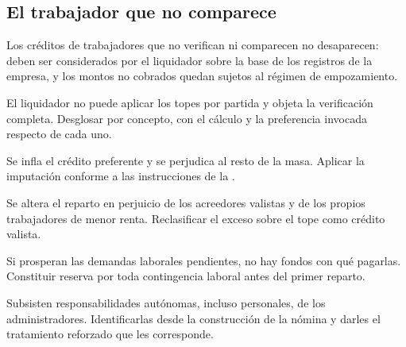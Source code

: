 \subsection{El trabajador que no comparece}

Los créditos de trabajadores que no verifican ni comparecen no desaparecen: deben ser
considerados por el liquidador sobre la base de los registros de la empresa, y los montos
no cobrados quedan sujetos al régimen de empozamiento.

\bloqueErrores

{El liquidador no puede aplicar los topes por partida y objeta la verificación completa.}
{Desglosar por concepto, con el cálculo y la preferencia invocada respecto de cada uno.}

{Se infla el crédito preferente y se perjudica al resto de la masa.}
{Aplicar la imputación conforme a las instrucciones de la \superir{}
\parencite{oficio-5080}.}

{Se altera el reparto en perjuicio de los acreedores valistas y de los propios
trabajadores de menor renta.}
{Reclasificar el exceso sobre el tope como crédito valista.}

{Si prosperan las demandas laborales pendientes, no hay fondos con qué pagarlas.}
{Constituir reserva por toda contingencia laboral antes del primer reparto.}

{Subsisten responsabilidades autónomas, incluso personales, de los administradores.}
{Identificarlas desde la construcción de la nómina y darles el tratamiento reforzado que
les corresponde.}
